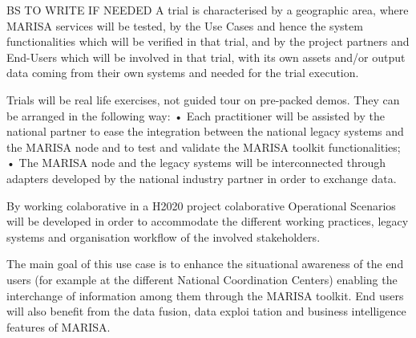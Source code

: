 BS TO WRITE IF NEEDED 
A trial is characterised by a geographic area, where MARISA services will be tested, by the Use Cases and hence the system functionalities which will be verified in that trial, and by the project partners and End-Users which will be involved in that trial, with its own assets and/or output data coming from their own systems and needed for the trial execution.

Trials will be real life exercises, not guided tour on pre-packed demos. They can be arranged in the following way:
    • Each practitioner will be assisted by the national partner to ease the integration between the national legacy systems and the MARISA node and to test and validate the MARISA toolkit functionalities;
    • The MARISA node and the legacy systems will be interconnected through adapters developed by the national industry partner in order to exchange data.
    
By working colaborative in a H2020 project colaborative  
Operational Scenarios will be developed in order to accommodate the different working practices, legacy systems and organisation workflow of the involved stakeholders.

The main goal of this use case is to enhance the situational awareness of the end users (for example at the different National Coordination Centers) enabling the interchange of information among them through the MARISA toolkit.
End users will also benefit from the data fusion, data exploi tation and business intelligence features of MARISA.




